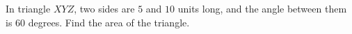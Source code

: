 In triangle $XYZ$, two sides are $5$ and $10$ units long, and the angle between them is $60$ degrees. Find the area of the triangle.
